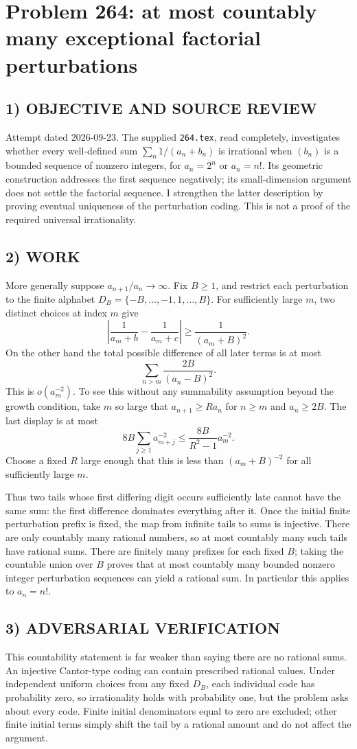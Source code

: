 \section{Problem 264: at most countably many exceptional factorial perturbations}
\subsection*{1) OBJECTIVE AND SOURCE REVIEW}
Attempt dated 2026-09-23. The supplied \texttt{264.tex}, read completely, investigates whether every well-defined sum $\sum_n1/(a_n+b_n)$ is irrational when $(b_n)$ is a bounded sequence of nonzero integers, for $a_n=2^n$ or $a_n=n!$. Its geometric construction addresses the first sequence negatively; its small-dimension argument does not settle the factorial sequence. I strengthen the latter description by proving eventual uniqueness of the perturbation coding. This is not a proof of the required universal irrationality.
\subsection*{2) WORK}
More generally suppose $a_{n+1}/a_n\to\infty$. Fix $B\ge1$, and restrict each perturbation to the finite alphabet $D_B=\{-B,\ldots,-1,1,\ldots,B\}$. For sufficiently large $m$, two distinct choices at index $m$ give
\[
\left|\frac1{a_m+b}-\frac1{a_m+c}\right|
\ge\frac1{(a_m+B)^2}.
\]
On the other hand the total possible difference of all later terms is at most
\[
\sum_{n>m}\frac{2B}{(a_n-B)^2}.
\]
This is $o(a_m^{-2})$. To see this without any summability assumption beyond the growth condition, take $m$ so large that $a_{n+1}\ge R a_n$ for $n\ge m$ and $a_n\ge2B$. The last display is at most
\[
8B\sum_{j\ge1}a_{m+j}^{-2}
\le\frac{8B}{R^2-1}a_m^{-2}.
\]
Choose a fixed $R$ large enough that this is less than $(a_m+B)^{-2}$ for all sufficiently large $m$.

Thus two tails whose first differing digit occurs sufficiently late cannot have the same sum: the first difference dominates everything after it. Once the initial finite perturbation prefix is fixed, the map from infinite tails to sums is injective. There are only countably many rational numbers, so at most countably many such tails have rational sums. There are finitely many prefixes for each fixed $B$; taking the countable union over $B$ proves that at most countably many bounded nonzero integer perturbation sequences can yield a rational sum. In particular this applies to $a_n=n!$.
\subsection*{3) ADVERSARIAL VERIFICATION}
This countability statement is far weaker than saying there are no rational sums. An injective Cantor-type coding can contain prescribed rational values. Under independent uniform choices from any fixed $D_B$, each individual code has probability zero, so irrationality holds with probability one, but the problem asks about every code. Finite initial denominators equal to zero are excluded; other finite initial terms simply shift the tail by a rational amount and do not affect the argument.
